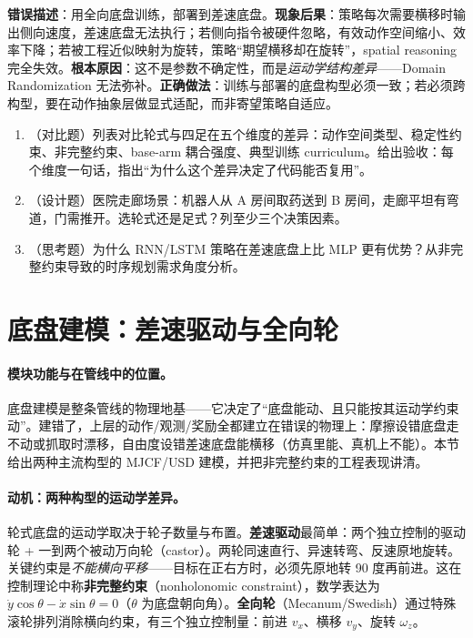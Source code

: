 \begin{pitfall}[把全向底盘训出的策略直接搬到差速底盘]
\textbf{错误描述}：用全向底盘训练，部署到差速底盘。\textbf{现象后果}：策略每次需要横移时输出侧向速度，差速底盘无法执行；若侧向指令被硬件忽略，有效动作空间缩小、效率下降；若被工程近似映射为旋转，策略“期望横移却在旋转”，spatial reasoning 完全失效。\textbf{根本原因}：这不是参数不确定性，而是\emph{运动学结构差异}——Domain Randomization 无法弥补。\textbf{正确做法}：训练与部署的底盘构型必须一致；若必须跨构型，要在动作抽象层做显式适配，而非寄望策略自适应。
\end{pitfall}

\begin{practice}[形态定位]
\begin{enumerate}
\item （对比题）列表对比轮式与四足在五个维度的差异：动作空间类型、稳定性约束、非完整约束、base-arm 耦合强度、典型训练 curriculum。给出验收：每个维度一句话，指出“为什么这个差异决定了代码能否复用”。
\item （设计题）医院走廊场景：机器人从 A 房间取药送到 B 房间，走廊平坦有弯道，门需推开。选轮式还是足式？列至少三个决策因素。
\item （思考题）为什么 RNN/LSTM 策略在差速底盘上比 MLP 更有优势？从非完整约束导致的时序规划需求角度分析。
\end{enumerate}
\end{practice}

\section{底盘建模：差速驱动与全向轮}
\label{sec:rlmc-wh-modeling}

\paragraph{模块功能与在管线中的位置。}底盘建模是整条管线的物理地基——它决定了“底盘能动、且只能按其运动学约束动”。建错了，上层的动作/观测/奖励全都建立在错误的物理上：摩擦设错底盘走不动或抓取时漂移，自由度设错差速底盘能横移（仿真里能、真机上不能）。本节给出两种主流构型的 MJCF/USD 建模，并把非完整约束的工程表现讲清。

\paragraph{动机：两种构型的运动学差异。}轮式底盘的运动学取决于轮子数量与布置。\textbf{差速驱动}最简单：两个独立控制的驱动轮 + 一到两个被动万向轮（castor）。两轮同速直行、异速转弯、反速原地旋转。关键约束是\emph{不能横向平移}——目标在正右方时，必须先原地转 90 度再前进。这在控制理论中称\textbf{非完整约束}（nonholonomic constraint），数学表达为 $\dot{y}\cos\theta-\dot{x}\sin\theta=0$（$\theta$ 为底盘朝向角）。\textbf{全向轮}（Mecanum/Swedish）通过特殊滚轮排列消除横向约束，有三个独立控制量：前进 $v_x$、横移 $v_y$、旋转 $\omega_z$。

